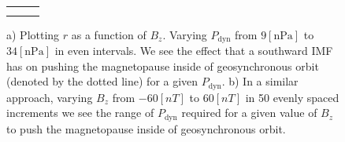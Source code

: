 \documentclass[12pt, letterpaper]{article}
\begin{document}
\begin{figure}
\def\tabularxcolumn#1{m{#1}}
\begin{tabularx}{\linewidth}{@{}cXX@{}}
\begin{tabular}{cc}
   & \\
\end{tabular}
\end{tabularx}
\caption{a) Plotting $r$ as a function of $B_{z}$. Varying $P_{\text{dyn}}$ from $9 \left[ \text{nPa} \right]$ to $34 \left[ \text{nPa} \right]$ in even intervals. We see the effect that a southward IMF has on pushing the magnetopause inside of geosynchronous orbit (denoted by the dotted line) for a given $P_{\text{dyn}}$. b) In a similar approach, varying $B_{z}$ from $-60 \left[ nT \right]$ to $60 \left[ nT \right]$ in 50 evenly spaced increments we see the range of $P_{\text{dyn}}$ required for a given value of $B_{z}$ to push the magnetopause inside of geosynchronous orbit.}
\label{fig:sens}
\end{figure}
\end{document}
